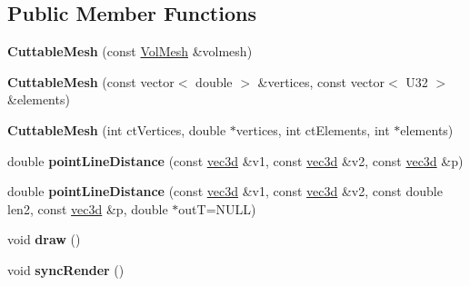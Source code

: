 \subsection*{Public Member Functions}
\begin{DoxyCompactItemize}
\item 
\hypertarget{classps_1_1CuttableMesh_a9969d385027ffbb77308dc1b44812a39}{}{\bfseries Cuttable\+Mesh} (const \hyperlink{classps_1_1elastic_1_1VolMesh}{Vol\+Mesh} \&volmesh)\label{classps_1_1CuttableMesh_a9969d385027ffbb77308dc1b44812a39}

\item 
\hypertarget{classps_1_1CuttableMesh_aa60935a8ca7343c3e139ef38b02af32f}{}{\bfseries Cuttable\+Mesh} (const vector$<$ double $>$ \&vertices, const vector$<$ U32 $>$ \&elements)\label{classps_1_1CuttableMesh_aa60935a8ca7343c3e139ef38b02af32f}

\item 
\hypertarget{classps_1_1CuttableMesh_aa881e5aa86338a74eb75e33ecdec6789}{}{\bfseries Cuttable\+Mesh} (int ct\+Vertices, double $\ast$vertices, int ct\+Elements, int $\ast$elements)\label{classps_1_1CuttableMesh_aa881e5aa86338a74eb75e33ecdec6789}

\item 
\hypertarget{classps_1_1CuttableMesh_a6a89ae5f513b9698e0fb809c6e5bde48}{}double {\bfseries point\+Line\+Distance} (const \hyperlink{classps_1_1base_1_1Vec3}{vec3d} \&v1, const \hyperlink{classps_1_1base_1_1Vec3}{vec3d} \&v2, const \hyperlink{classps_1_1base_1_1Vec3}{vec3d} \&p)\label{classps_1_1CuttableMesh_a6a89ae5f513b9698e0fb809c6e5bde48}

\item 
\hypertarget{classps_1_1CuttableMesh_a7b3446f71b62a03e5ffa7ae975f05359}{}double {\bfseries point\+Line\+Distance} (const \hyperlink{classps_1_1base_1_1Vec3}{vec3d} \&v1, const \hyperlink{classps_1_1base_1_1Vec3}{vec3d} \&v2, const double len2, const \hyperlink{classps_1_1base_1_1Vec3}{vec3d} \&p, double $\ast$out\+T=N\+U\+L\+L)\label{classps_1_1CuttableMesh_a7b3446f71b62a03e5ffa7ae975f05359}

\item 
\hypertarget{classps_1_1CuttableMesh_a5b53677ca793f330d8653dedcbe2d10b}{}void {\bfseries draw} ()\label{classps_1_1CuttableMesh_a5b53677ca793f330d8653dedcbe2d10b}

\item 
\hypertarget{classps_1_1CuttableMesh_ac9f811f9e12fc893d73212b9f4c15313}{}void {\bfseries sync\+Render} ()\label{classps_1_1CuttableMesh_ac9f811f9e12fc893d73212b9f4c15313}


\end{DoxyCompactItemize}
